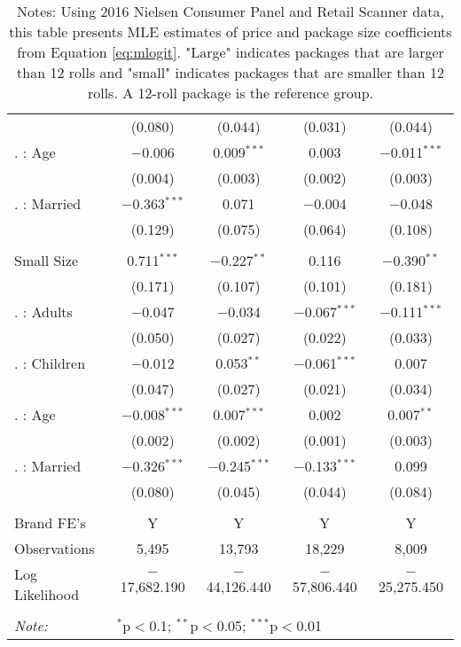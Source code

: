 \begin{table}[!htbp]
{\begin{tabular}{@{\extracolsep{5pt}}lcccc}
  & (0.080) & (0.044) & (0.031) & (0.044) \\
  . : Age & $-$0.006 & 0.009$^{***}$ & 0.003 & $-$0.011$^{***}$ \\
  & (0.004) & (0.003) & (0.002) & (0.003) \\
  . : Married & $-$0.363$^{***}$ & 0.071 & $-$0.004 & $-$0.048 \\
  & (0.129) & (0.075) & (0.064) & (0.108) \\
\hline \\[-1.8ex]
  Small Size & 0.711$^{***}$ & $-$0.227$^{**}$ & 0.116 & $-$0.390$^{**}$ \\
  & (0.171) & (0.107) & (0.101) & (0.181) \\
  . : Adults & $-$0.047 & $-$0.034 & $-$0.067$^{***}$ & $-$0.111$^{***}$ \\
  & (0.050) & (0.027) & (0.022) & (0.033) \\
  . : Children & $-$0.012 & 0.053$^{**}$ & $-$0.061$^{***}$ & 0.007 \\
  & (0.047) & (0.027) & (0.021) & (0.034) \\
  . : Age & $-$0.008$^{***}$ & 0.007$^{***}$ & 0.002 & 0.007$^{**}$ \\
  & (0.002) & (0.002) & (0.001) & (0.003) \\
  . : Married & $-$0.326$^{***}$ & $-$0.245$^{***}$ & $-$0.133$^{***}$ & 0.099 \\
  & (0.080) & (0.045) & (0.044) & (0.084) \\
 \hline \\[-1.8ex]
Brand FE's & Y & Y & Y & Y \\
Observations & 5,495 & 13,793 & 18,229 & 8,009 \\
Log Likelihood & $-$17,682.190 & $-$44,126.440 & $-$57,806.440 & $-$25,275.450 \\
\hline
\hline \\[-1.8ex]
\textit{Note:}  & \multicolumn{4}{l}{$^{*}$p$<$0.1; $^{**}$p$<$0.05; $^{***}$p$<$0.01} \\
\end{tabular}
}
\caption*{Notes: Using 2016 Nielsen Consumer Panel and Retail Scanner data, this table presents MLE estimates of price and package size coefficients from Equation \ref{eq:mlogit}. "Large" indicates packages that are larger than 12 rolls and "small" indicates packages that are smaller than 12 rolls. A 12-roll package is the reference group.}
\end{table}
